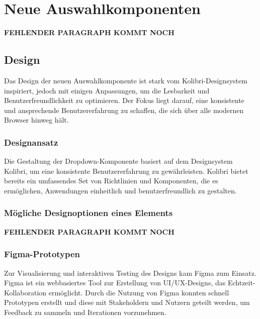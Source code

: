 \chapter{Neue Auswahlkomponenten}

{\color{red} \textbf{FEHLENDER PARAGRAPH KOMMT NOCH}}


\section{Design}

Das Design der neuen Auswahlkomponente ist stark vom Kolibri-Designsystem inspiriert, jedoch mit einigen Anpassungen, um die Lesbarkeit und Benutzerfreundlichkeit zu optimieren. 
Der Fokus liegt darauf, eine konsistente und ansprechende Benutzererfahrung zu schaffen, die sich über alle modernen Browser hinweg hält.


\subsection{Designansatz}

Die Gestaltung der Dropdown-Komponente basiert auf dem Designsystem Kolibri, um eine konsistente Benutzererfahrung zu gewährleisten. 
Kolibri bietet bereits ein umfassendes Set von Richtlinien und Komponenten, die es ermöglichen, Anwendungen einheitlich und benutzerfreundlich zu gestalten.


\subsection{Mögliche Designoptionen eines Elements}

{\color{red} \textbf{FEHLENDER PARAGRAPH KOMMT NOCH}}


\clearpage
\subsection{Figma-Prototypen}

Zur Visualisierung und interaktiven Testing des Designs kam Figma zum Einsatz. 
Figma ist ein webbasiertes Tool zur Erstellung von UI/UX-Designs, das Echtzeit-Kollaboration ermöglicht. 
Durch die Nutzung von Figma konnten schnell Prototypen erstellt und diese mit Stakeholdern und Nutzern geteilt werden, um Feedback zu sammeln und Iterationen vorzunehmen.

